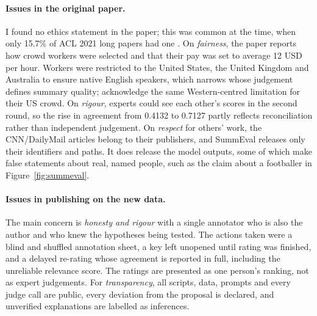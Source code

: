 \documentclass[11pt]{article}
\begin{document}
\paragraph{Issues in the original paper.}
I found no ethics statement in the paper; this was common at the time, when only 15.7\% of ACL 2021 long papers had one \citep{benotti-blackburn-2022-ethics}. On \emph{fairness}, the paper reports how crowd workers were selected and that their pay was set to average 12 USD per hour. Workers were restricted to the United States, the United Kingdom and Australia to ensure native English speakers, which narrows whose judgement defines summary quality; \citet{pyatkin-etal-2023-clarifydelphi} acknowledge the same Western-centred limitation for their US crowd. On \emph{rigour}, experts could see each other's scores in the second round, so the rise in agreement from 0.4132 to 0.7127 partly reflects reconciliation rather than independent judgement. On \emph{respect} for others' work, the CNN/DailyMail articles belong to their publishers, and SummEval releases only their identifiers and paths. It does release the model outputs, some of which make false statements about real, named people, such as the claim about a footballer in Figure~\ref{fig:summeval}.

\paragraph{Issues in publishing on the new data.}
The main concern is \emph{honesty and rigour} with a single annotator who is also the author and who knew the hypotheses being tested. The actions taken were a blind and shuffled annotation sheet, a key left unopened until rating was finished, and a delayed re-rating whose agreement is reported in full, including the unreliable relevance score. The ratings are presented as one person's ranking, not as expert judgements. For \emph{transparency}, all scripts, data, prompts and every judge call are public, every deviation from the proposal is declared, and unverified explanations are labelled as inferences.
\end{document}
